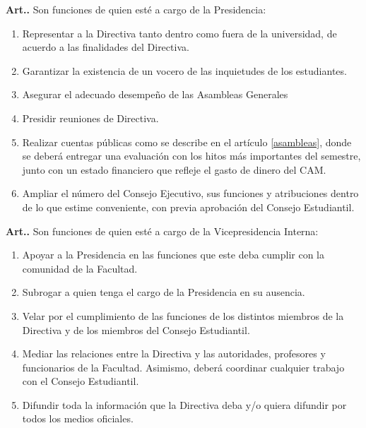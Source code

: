\documentclass[letterpaper,11pt]{article}
\newcounter{art}
\newenvironment{art}{\refstepcounter{art}\mbox{\textbf{Art.{\space}\theart.}}\ignorespaces}{}
\begin{document}
\begin{art}\label{funcionesPresidencia}
    Son funciones de quien esté a cargo de la Presidencia:
    \begin{enumerate}
        \item Representar a la Directiva tanto dentro como fuera de la universidad, de acuerdo a las finalidades del Directiva.
        \item Garantizar la existencia de un vocero de las inquietudes de los estudiantes.
        \item Asegurar el adecuado desempeño de las Asambleas Generales
        \item Presidir reuniones de Directiva.
        \item Realizar cuentas públicas como se describe en el artículo \ref{asambleas}, donde se deberá entregar una evaluación con los hitos más importantes del semestre, junto con un estado financiero que refleje el gasto de dinero del CAM.
        \item Ampliar el número del Consejo Ejecutivo, sus funciones y atribuciones dentro de lo que estime conveniente, con previa aprobación del Consejo Estudiantil.
    \end{enumerate}
\end{art}

\begin{art}\label{funcionesVicepresidenciaInterno}
    Son funciones de quien esté a cargo de la Vicepresidencia Interna:
    \begin{enumerate}
        \item Apoyar a la Presidencia en las funciones que este deba cumplir con la comunidad de la Facultad.
        \item Subrogar a quien tenga el cargo de la Presidencia en su ausencia.
        \item Velar por el cumplimiento de las funciones de los distintos miembros de la Directiva y de los miembros del Consejo Estudiantil.
        \item Mediar las relaciones entre la Directiva y las autoridades, profesores y funcionarios de la Facultad. Asimismo, deberá coordinar cualquier trabajo con el Consejo Estudiantil.
        \item Difundir toda la información que la Directiva deba y/o quiera difundir por todos los medios oficiales.
    \end{enumerate}
\end{art}
\end{document}

